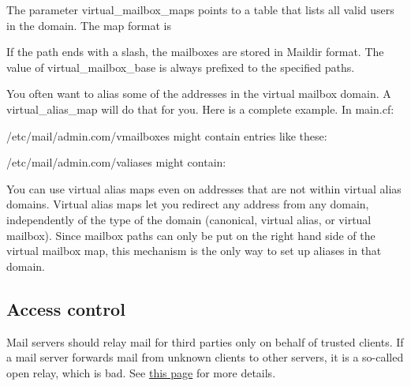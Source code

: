 The parameter {virtual\_mailbox\_maps} points to a table that lists all
valid users in the domain. The map format is


If the path ends with a slash, the mailboxes are stored in {Maildir}
format. The value of {virtual\_mailbox\_base} is always prefixed to the
specified paths.

You often want to alias some of the addresses in the virtual mailbox
domain. A {virtual\_alias\_map} will do that for you. Here is a complete
example. In
{main.cf}:\protect\hypertarget{part0026_split_062.htmlux5cux23_idIndexMarker2725}{}{}


{/etc/mail/admin.com/vmailboxes} might contain entries like these:


{/etc/mail/admin.com/valiases} might contain:


You can use virtual alias maps even on addresses that are not within
virtual alias domains. Virtual alias maps let you redirect any address
from any domain, independently of the type of the domain (canonical,
virtual alias, or virtual mailbox). Since mailbox paths can only be put
on the right hand side of the virtual mailbox map, this mechanism is the
only way to set up aliases in that domain.

\protect\hypertarget{part0026_split_063.html}{}{}

\hypertarget{part0026_split_063.htmlux5cux23_idContainer1247}{}
\hypertarget{part0026_split_063.htmlux5cux23calibre_pb_62}{%
\subsection[Access
control]{\texorpdfstring{\protect\hypertarget{part0026_split_063.htmlux5cux23_idTextAnchor1187}{}{}Access
control}{Access control}}\label{part0026_split_063.htmlux5cux23calibre_pb_62}}

\protect\hypertarget{part0026_split_063.htmlux5cux23_idIndexMarker2726}{}{}Mail
servers should relay mail for third parties only on behalf of trusted
clients. If a mail server forwards mail from unknown clients to other
servers, it is a so-called open relay, which is bad. See
\protect\hyperlink{part0026_split_037.htmlux5cux23_idTextAnchor1093}{this
page} for more details.

